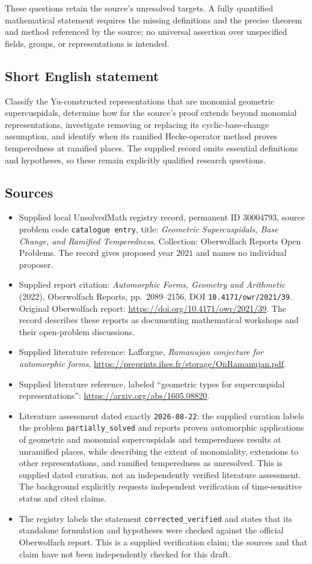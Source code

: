 \documentclass[11pt]{article}
\begin{document}
These questions retain the source's unresolved targets. A fully quantified mathematical statement requires the missing definitions and the precise theorem and method referenced by the source; no universal assertion over unspecified fields, groups, or representations is intended.
\subsection{Short English statement}
Classify the Yu-constructed representations that are monomial geometric supercuspidals, determine how far the source's proof extends beyond monomial representations, investigate removing or replacing its cyclic-base-change assumption, and identify when its ramified Hecke-operator method proves temperedness at ramified places. The supplied record omits essential definitions and hypotheses, so these remain explicitly qualified research questions.
\subsection{Sources}
\begin{itemize}
\item Supplied local UnsolvedMath registry record, permanent ID \(30004793\), source problem code \texttt{catalogue entry}, title: \emph{Geometric Supercuspidals, Base Change, and Ramified Temperedness}. Collection: Oberwolfach Reports Open Problems. The record gives proposed year \(2021\) and names no individual proposer.
\item Supplied report citation: \emph{Automorphic Forms, Geometry and Arithmetic} (2022), Oberwolfach Reports, pp.\ 2089--2156, DOI \texttt{10.4171/owr/2021/39}. Original Oberwolfach report: \url{https://doi.org/10.4171/owr/2021/39}. The record describes these reports as documenting mathematical workshops and their open-problem discussions.
\item Supplied literature reference: Lafforgue, \emph{Ramanujan conjecture for automorphic forms}, \url{https://preprints.ihes.fr/storage/OnRamanujan.pdf}.
\item Supplied literature reference, labeled ``geometric types for supercuspidal representations'': \url{https://arxiv.org/abs/1605.08820}.
\item Literature assessment dated exactly \texttt{2026-08-22}: the supplied curation labels the problem \texttt{partially\_solved} and reports proven automorphic applications of geometric and monomial supercuspidals and temperedness results at unramified places, while describing the extent of monomiality, extensions to other representations, and ramified temperedness as unresolved. This is supplied dated curation, not an independently verified literature assessment. The background explicitly requests independent verification of time-sensitive status and cited claims.
\item The registry labels the statement \texttt{corrected\_verified} and states that its standalone formulation and hypotheses were checked against the official Oberwolfach report. This is a supplied verification claim; the sources and that claim have not been independently checked for this draft.
\end{itemize}
\end{document}
